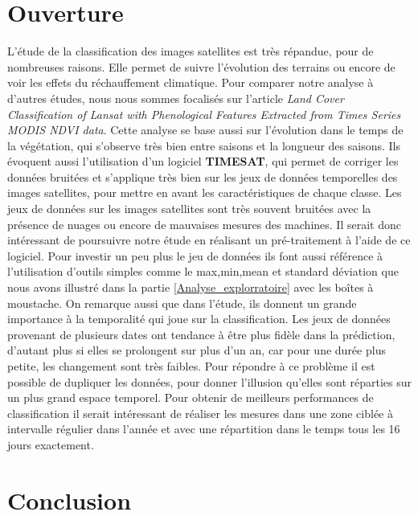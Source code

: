 \documentclass[twocolumn,10pt]{article}
\begin{document}
\section{Ouverture}
L'étude de la classification des images satellites est très répandue, pour de nombreuses raisons. Elle permet de suivre l'évolution des terrains ou encore de voir les effets du réchauffement climatique. Pour comparer notre analyse à d'autres études, nous nous sommes focalisés sur l'article \cite{landClassification} \textit{Land Cover Classification of Lansat with Phenological Features Extracted from Times Series MODIS NDVI data}. Cette analyse se base aussi sur l'évolution dans le temps de la végétation, qui s'observe très bien entre saisons et la longueur des saisons. Ils évoquent aussi l'utilisation d'un logiciel \textbf{TIMESAT},  qui permet de corriger les données bruitées et s'applique très bien sur les jeux de données temporelles des images satellites, pour mettre en avant les caractéristiques de chaque classe. Les jeux de données sur les images satellites sont très souvent bruitées avec la présence de nuages ou encore de mauvaises mesures des machines. Il serait donc intéressant de poursuivre notre étude en réalisant un pré-traitement à l'aide de ce logiciel. Pour investir un peu plus le jeu de données ils font aussi référence à l'utilisation d'outils simples comme le max,min,mean et standard déviation que nous avons illustré dans la partie \ref{Analyse_explorratoire} avec les boîtes à moustache. On remarque aussi que dans l'étude, ils donnent un grande importance à la temporalité qui joue sur la classification. Les jeux de données provenant de plusieurs dates ont tendance à être plus fidèle dans la prédiction, d'autant plus si elles se prolongent sur plus d'un an, car pour une durée plus petite, les changement sont très faibles. Pour répondre à ce problème il est possible de dupliquer les données, pour donner l'illusion qu'elles sont réparties sur un plus grand espace temporel. Pour obtenir de meilleurs performances de classification il serait intéressant de réaliser les mesures dans une zone ciblée à intervalle régulier dans l'année et avec une répartition dans le temps tous les 16 jours exactement. 


\section{Conclusion}
\end{document}
